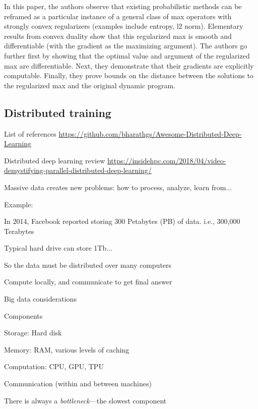 \documentclass[english]{article}
\begin{document}
In this paper, the authors observe that existing probabilistic methods can be reframed as a particular instance of a general class of max operators with strongly convex regularizers (examples include entropy, l2 norm). Elementary results from convex duality show that this regularized max is smooth and differentiable (with the gradient as the maximizing argument). The authors go further first by showing that the optimal value and argument of the regularized max are differentiable. Next, they demonstrate that their gradients are explicitly computable. Finally, they prove bounds on the distance between the solutions to the regularized max and the original dynamic program. 

\eitem 



\subsection{Distributed training}


\benum 
\item List of references \url{https://github.com/bharathgs/Awesome-Distributed-Deep-Learning}


Distributed deep learning review \url{https://insidehpc.com/2018/04/video-demystifying-parallel-distributed-deep-learning/}


\item Massive data creates new problems: how to process, analyze, learn from...
\item Example: 
\bitem
\item In 2014, Facebook reported storing 300 Petabytes (PB) of data. i.e., 300,000 Terabytes
\item Typical hard drive can store 1Tb...
\item So the data must be distributed over many computers
\item Compute locally, and communicate to get final answer
\eitem



\item {Big data considerations}
\bitem
\item Components
\bitem
\item Storage: Hard disk 
\item Memory: RAM, various levels of caching
\item Computation: CPU, GPU, TPU
\item Communication (within and between machines)
\eitem
\item There is always a \emph{bottleneck}---the slowest component
\eitem
\end{document}
